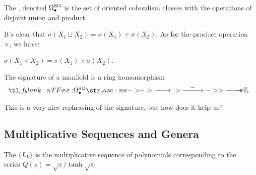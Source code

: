 \begin{definition}
	The , denoted $\Omega_\bullet^{\operatorname{SO}}$ is the set of oriented cobordism classes with the operations of disjoint union and product.
\end{definition}

It's clear that $\sigma(X_1\sqcup X_2)=\sigma(X_1)+\sigma(X_2)$. As for the product operation $\times$, we have:

\begin{proposition}
	$\sigma(X_1\times X_2) = \sigma(X_1)\times \sigma(X_2)$.
\end{proposition}

\begin{corollary}
	The signature of a manifold is a ring homomorphism
	\[
		\lkxfunc{\sigma}{\Omega^\SO_{\bullet}}{\Z.}
	\]
\end{corollary}

This is a very nice rephrasing of the signature, but how does it help us?


\subsection{Multiplicative Sequences and Genera}


\begin{definition}
	The  $\{L_k\}$ is the multiplicative sequence of polynomials corresponding to the series $Q(z) = \sqrt{z}/\tanh\sqrt{z}$.
\end{definition}


